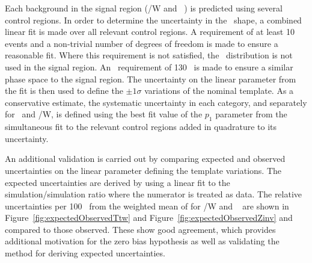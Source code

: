 Each background in the signal region (\ttbar/W  and \zInv~) is predicted 
using several control regions. In order to determine the uncertainty in
the \mht~shape, a combined linear fit is made over all relevant control regions. 
A requirement of at least 10 events and a non-trivial
number of degrees of freedom is made to ensure a reasonable fit. Where this
requirement is not satisfied, the \mht~distribution is not used in the signal region.
An \mht~requirement of 130 \GeV~is made to ensure a similar phase space to 
the signal region.
The uncertainty on the linear parameter from the fit is then
used to define the $\pm 1 \sigma$ variations of the nominal template.
As a conservative estimate, the systematic uncertainty in each category, and separately
for \zInv~and \ttbar/W, is defined using the best fit value of the $p_1$ parameter 
from the simultaneous fit to the relevant control regions
added in quadrature to its uncertainty.

An additional validation is carried out by comparing expected and observed uncertainties
on the linear parameter defining the template variations.
The expected uncertainties are derived by using a linear fit to the simulation/simulation ratio where the numerator
is treated as data. The relative uncertainties per 100 \GeV~from the weighted mean of \mht
for \ttbar/W and \zInv~ are shown in Figure~\ref{fig:expectedObservedTtw} 
and Figure~\ref{fig:expectedObservedZinv} and compared to those observed.
These show good agreement, which provides additional motivation for the 
zero bias hypothesis as well as validating the method for deriving expected uncertainties.


